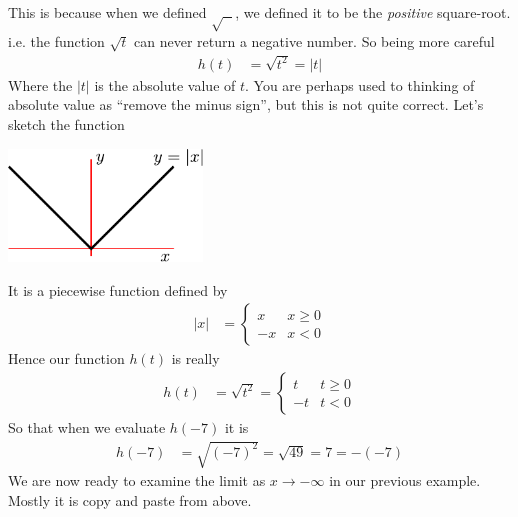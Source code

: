 This is because when we defined $\sqrt{\text{ }}$, we defined it to be the
\emph{positive} square-root. i.e. the function $\sqrt{t}$ can never return a
negative number. So being more careful
\begin{align*}
  h(t) &= \sqrt{t^2} = | t |
\end{align*}
Where the $|t|$ is the absolute value of $t$. You are perhaps used to thinking
of absolute value as ``remove the minus sign'', but this is not quite correct.
Let's sketch the function
\begin{fig}
\begin{center}
\includegraphics[height=3cm]{abs}
\end{center}
\end{fig}
It is a piecewise function defined by
\begin{align*}
  |x| &= \begin{cases}
          x & x \geq 0\\
	  -x & x < 0
         \end{cases}
\end{align*}
Hence our function $h(t)$ is really
\begin{align*}
  h(t) &= \sqrt{t^2} =
	  \begin{cases}
          t & t \geq 0\\
	  -t & t < 0
         \end{cases}
\end{align*}
So that when we evaluate $h(-7)$ it is
\begin{align*}
  h(-7) &= \sqrt{ (-7)^2 } = \sqrt{49} = 7 = -(-7)
\end{align*}
We are now ready to examine the limit as $x \to -\infty$ in our previous
example. Mostly it is copy and paste from above.
